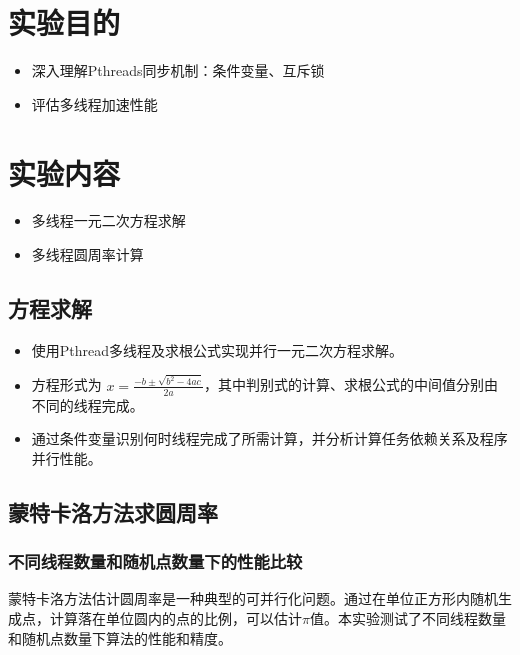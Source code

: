 \documentclass{SYSUReport}
\date{2025年4月16日}
\begin{document}
\cover
\thispagestyle{empty}
\clearpage

\section{实验目的}
\begin{itemize}
    \item 深入理解Pthreads同步机制：条件变量、互斥锁
    \item 评估多线程加速性能
\end{itemize}

\section{实验内容}
\begin{itemize}
    \item 多线程一元二次方程求解
    \item 多线程圆周率计算
\end{itemize}

\subsection{方程求解}
\begin{itemize}
    \item 使用Pthread多线程及求根公式实现并行一元二次方程求解。
    \item 方程形式为 $x = \frac{-b\pm\sqrt{b^2-4ac}}{2a}$，其中判别式的计算、求根公式的中间值分别由不同的线程完成。
    \item 通过条件变量识别何时线程完成了所需计算，并分析计算任务依赖关系及程序并行性能。
\end{itemize}

\subsection{蒙特卡洛方法求圆周率}

\subsubsection{不同线程数量和随机点数量下的性能比较}

蒙特卡洛方法估计圆周率是一种典型的可并行化问题。通过在单位正方形内随机生成点，计算落在单位圆内的点的比例，可以估计$\pi$值。本实验测试了不同线程数量和随机点数量下算法的性能和精度。
\end{document}
